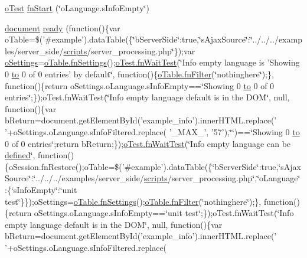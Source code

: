 \begin{DoxyCompactItemize}
\item 
\hyperlink{unit__test_8js_a3b2d259e2df3b6860d9047a92d09d0d6}{o\+Test} \hyperlink{4__server-side_2o_language_8s_info_empty_8js_ad031b841b6de059488c78036f2159310}{fn\+Start} (\char`\"{}o\+Language.\+s\+Info\+Empty\char`\"{})
\item 
\hyperlink{outside_events_8js_aa14f8e0338cced6720590fd2ea13bd4b}{document} \hyperlink{4__server-side_2o_language_8s_info_empty_8js_a6b501fc148ec2c3658c0e19744ef8505}{ready} (function()\{var o\+Table=\$('\#example').data\+Table(\{\char`\"{}b\+Server\+Side\char`\"{}\+:true,\char`\"{}s\+Ajax\+Source\char`\"{}\+:\char`\"{}../../../examples/server\+\_\+side/\hyperlink{tinymce_8jquery_8dev_8js_a09066d4d580eeec222f858d588b4cdef}{scripts}/server\+\_\+processing.\+php\char`\"{}\});var \hyperlink{model_8settings_8js_a4857b9c813b4dea010668e9555d0aca7}{o\+Settings}=\hyperlink{api_8methods_8js_a78f387fab92a85c2cb7830bc5d8a6141}{o\+Table.\+fn\+Settings}();\hyperlink{onhold_24__server-side_2__zero__config_8js_ab25c4d596771c0133cdc45178ce72c3d}{o\+Test.\+fn\+Wait\+Test}(\char`\"{}Info empty language is 'Showing 0 \hyperlink{jquery-ui_8js_af6086621f45baa2cf538f19e45d3c263}{to} 0 of 0 entries' by default\char`\"{}, function()\{\hyperlink{api_8methods_8js_a7b6987d0a9ab9c5303d10ef62790885d}{o\+Table.\+fn\+Filter}(\char`\"{}nothinghere\char`\"{});\}, function()\{return o\+Settings.\+o\+Language.\+s\+Info\+Empty==\char`\"{}Showing 0 \hyperlink{jquery-ui_8js_af6086621f45baa2cf538f19e45d3c263}{to} 0 of 0 entries\char`\"{};\});o\+Test.\+fn\+Wait\+Test(\char`\"{}Info empty language default is in the D\+O\+M\char`\"{}, null, function()\{var b\+Return=document.\+get\+Element\+By\+Id('example\+\_\+info').inner\+H\+T\+M\+L.\+replace(' '+o\+Settings.\+o\+Language.\+s\+Info\+Filtered.\+replace( '\+\_\+\+M\+A\+X\+\_\+', '57'),\char`\"{}\char`\"{})==\char`\"{}Showing 0 \hyperlink{jquery-ui_8js_af6086621f45baa2cf538f19e45d3c263}{to} 0 of 0 entries\char`\"{};return b\+Return;\});\hyperlink{onhold_24__server-side_2__zero__config_8js_ab25c4d596771c0133cdc45178ce72c3d}{o\+Test.\+fn\+Wait\+Test}(\char`\"{}Info empty language can be \hyperlink{tinymce_8js_a8cb6212cde9926d156ab5912c9b547cf}{defined}\char`\"{}, function()\{o\+Session.\+fn\+Restore();o\+Table=\$('\#example').data\+Table(\{\char`\"{}b\+Server\+Side\char`\"{}\+:true,\char`\"{}s\+Ajax\+Source\char`\"{}\+:\char`\"{}../../../examples/server\+\_\+side/\hyperlink{tinymce_8jquery_8dev_8js_a09066d4d580eeec222f858d588b4cdef}{scripts}/server\+\_\+processing.\+php\char`\"{},\char`\"{}o\+Language\char`\"{}\+:\{\char`\"{}s\+Info\+Empty\char`\"{}\+:\char`\"{}unit test\char`\"{}\}\});o\+Settings=\hyperlink{api_8methods_8js_a78f387fab92a85c2cb7830bc5d8a6141}{o\+Table.\+fn\+Settings}();\hyperlink{api_8methods_8js_a7b6987d0a9ab9c5303d10ef62790885d}{o\+Table.\+fn\+Filter}(\char`\"{}nothinghere\char`\"{});\}, function()\{return o\+Settings.\+o\+Language.\+s\+Info\+Empty==\char`\"{}unit test\char`\"{};\});o\+Test.\+fn\+Wait\+Test(\char`\"{}Info empty language default is in the D\+O\+M\char`\"{}, null, function()\{var b\+Return=document.\+get\+Element\+By\+Id('example\+\_\+info').inner\+H\+T\+M\+L.\+replace(' '+o\+Settings.\+o\+Language.\+s\+Info\+Filtered.\+replace( 
\end{DoxyCompactItemize}
